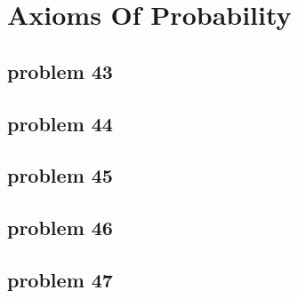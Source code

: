 \section{Axioms Of Probability}

\subsection{problem 43}


\subsection{problem 44}


\subsection{problem 45}


\subsection{problem 46}


\subsection{problem 47}


